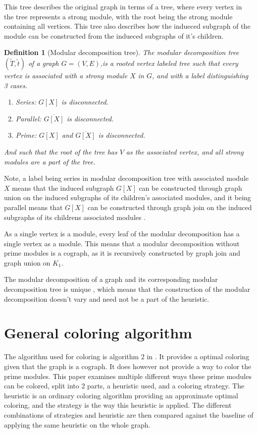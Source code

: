\documentclass{amsart}
\newtheorem{definition}{Definition}[section]
\newcommand{\T}{\widetilde{T}}
\renewcommand{\t}{\widetilde{t}}
\begin{document}
This tree describes the original graph in terms of a tree, where every vertex 
in the tree represents a strong module, with the root being the strong module
containing all vertices. This tree also describes how the indueced subgraph of the
module can be constructed from the indueced subgraphs of it's children.
\begin{definition}[Modular decomposition tree]
    The modular decomposition tree $(\T,\t)$ of a graph $G = (V,E)$,is a rooted
    vertex labeled tree such that every vertex is associated with a strong
    module $X$ in $G$, and with a label distinguishing 3 cases.
    \begin{enumerate}
        \item Series: $G[X]$ is disconnected.
        \item Parallel: $\overline{G[X]}$ is disconnected.
        \item Prime: $G[X]$ and $\overline{G[X]}$ is disconnected.
    \end{enumerate}
    And such that the root of the tree has $V$ as the associated vertex, and all 
    strong modules are a part of the tree.
\end{definition}

Note, a label being series in modular decomposition tree with associated module
$X$ means that the induced subgraph $G[X]$ can be constructed through graph
union on the induced subgraphs of its children's associated modules, and it being
parallel means that $G[X]$ can be constructed through graph join on the
induced subgraphs of its childrens associated modules \cite{HCL}.

As a single vertex is a module, every leaf of the modular decomposition has
a single vertex as a module. This means that a modular decomposition without
prime modules is a cograph, as it is recursively constructed by graph join and
graph union on $K_1$.

The modular decomposition of a graph and its corresponding modular
decomposition tree is unique \cite{MDUnique}, which means that the construction
of the modular decomposition doesn't vary and need not be a part of
the heuristic.


\section{General coloring algorithm}

The algorithm used for coloring is algorithm 2 in \cite{HCL}. It provides a
optimal coloring given that the graph is a cograph. It does however not
provide a way to color the prime modules. This paper examines multiple different
ways these prime modules can be colored, split into 2 parts, a heuristic used,
and a coloring strategy. The heuristic is an ordinary coloring algorithm
providing an approximate optimal coloring, and the strategy is the way this
heuristic is applied. The different combinations of strategies and heuristic are
then compared against the baseline of applying the same heuristic on the whole
graph.
\end{document}
